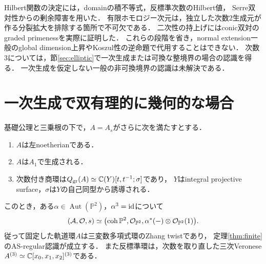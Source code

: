\documentclass[11pt,a4paper]{ltjsarticle}
\begin{document}
\begin{remark}[使用した公理と境界の次数]
Hilbert関数の決定には，domainの積不等式，反標準次数のHilbert値，
Serre双対性からの剰余障害を用いた．
有限ホモロジー次元は，独立した次数2生成元が作る分裂拡大を排除する箇所で不可欠である．
二次性の持上げにはconic双対のgraded primenessを実際に証明した．
これらの段階を省き，normal extension一般のglobal dimension上昇やKoszul性の逆命題で代用することはできない．
次数3については，節\ref{sec:elliptic}で一次生成または可換な整境界の場合の認識を得る．
一次生成を仮定しない一般の非可換境界の認識は未解決である．
\end{remark}


\section{一次生成で双有理的に幾何的な場合}\label{sec:birational}

\begin{theorem}[双有理的に可換な部分クラスの認識]\label{thm:birational-recognition}
基礎公理と三乗根の下で，$A=A_s$がさらに次を満たすとする．
\begin{enumerate}[label=(\roman*)]
\item $A$は左noetherianである．
\item $A$は$A_1$で生成される．
\item 次数付き商環は$Q_{\mathrm{gr}}(A)\simeq\mathbb C(Y)[t,t^{-1};\sigma]$であり，
$Y$はintegral projective surface，$\sigma$は$Y$の自己同型から誘導される．
\end{enumerate}
このとき，ある$\alpha\in\operatorname{Aut}(\mathbb P^2)$，$\alpha^3=\operatorname{id}$について
\[
 (\mathcal A,\mathcal O,s)\simeq
 \bigl(\operatorname{coh}\mathbb P^2,\mathcal O_{\mathbb P^2},
       \alpha^*(-)\otimes\mathcal O_{\mathbb P^2}(1)\bigr).
\]
従って固定した軌道環$A$は三変数多項式環のZhang twistであり，
定理\ref{thm:finite}のAS-regular認識が成立する．
また反標準環は，次数を取り直した三次Veronese
$A^{(3)}\simeq\mathbb C[x_0,x_1,x_2]^{(3)}$である．
\end{theorem}
\end{document}
